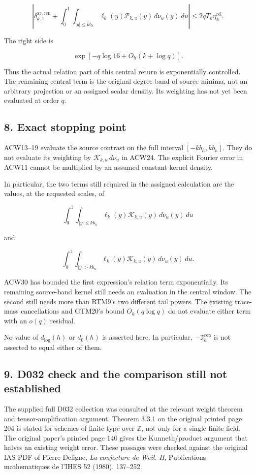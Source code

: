 \documentclass[11pt,a4paper]{article}
\begin{document}
\[
\boxed{
\left|\delta_{k,1}^{\mathrm{ar,cen}}
+\int_0^1\int_{|y|\le kb_h}
\ell_k(y)\mathcal P_{k,u}(y)\,d\nu_u(y)\,du\right|
\le2qT_k\eta_k^{\mathrm{rel}}.}
\tag{ACW30}
\]

The right side is

\[
\exp[-q\log16+O_h(k+\log q)].
\]

Thus the actual relation part of this central return is exponentially controlled. The remaining central term is the original degree band of source minima, not an arbitrary projection or an assigned scalar density. Its weighting has not yet been evaluated at order \(q\).

\subsection{8. Exact stopping point}\label{acw:exact-stopping-point}

ACW13--19 evaluate the source contrast on the full interval \([-kb_h,kb_h]\). They do not evaluate its weighting by \(\mathcal K_{k,u}\,d\nu_u\) in ACW24. The explicit Fourier error in ACW11 cannot be multiplied by an assumed constant kernel density.

In particular, the two terms still required in the assigned calculation are the values, at the requested scales, of

\[
\int_0^1\int_{|y|\le kb_h}
\ell_k(y)\mathcal K_{k,u}(y)\,d\nu_u(y)\,du
\]

and

\[
\int_0^1\int_{|y|>kb_h}
\ell_k(y)\mathcal K_{k,u}(y)\,d\nu_u(y)\,du.
\]

ACW30 has bounded the first expression's relation term exponentially. Its remaining source-band kernel still needs an evaluation in the central window. The second still needs more than RTM9's two different tail powers. The existing trace-mass cancellations and GTM20's bound \(O_h(q\log q)\) do not evaluate either term with an \(o(q)\) residual.

No value of \(d_{\log}(h)\) or \(d_0(h)\) is asserted here. In particular, \(-\mathfrak I_h^{\mathrm{cen}}\) is not asserted to equal either of them.

\subsection{9. D032 check and the comparison still not established}\label{acw:d032-check-and-the-comparison-still-not-established}

The supplied full D032 collection was consulted at the relevant weight theorem and tensor-amplification argument. Theorem 3.3.1 on the original printed page 204 is stated for schemes of finite type over \(\mathbb Z\), not only for a single finite field. The original paper's printed page 140 gives the Kunneth/product argument that halves an existing weight error. These passages were checked against the original IAS PDF of Pierre Deligne, \emph{La conjecture de Weil. II}, Publications mathematiques de l'IHES 52 (1980), 137--252.
\end{document}
